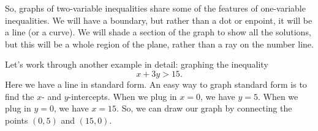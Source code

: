 So, graphs of two-variable inequalities share some of the features of one-variable inequalities. We will have a boundary, but rather than a dot or enpoint, it will be a line (or a curve). We will shade a section of the graph to show all the solutions, but this will be a whole region of the plane, rather than a ray on the number line.

%
%

Let's work through another example in detail: graphing the inequality
\[x + 3y > 15.\]
Here we have a line in standard form. An easy way to graph standard form is to find the $x$- and $y$-intercepts. When we plug in $x=0$, we have $y = 5$. When we plug in $y=0$, we have $x = 15$. So, we can draw our graph by connecting the points $(0, 5)$ and $(15, 0)$.

